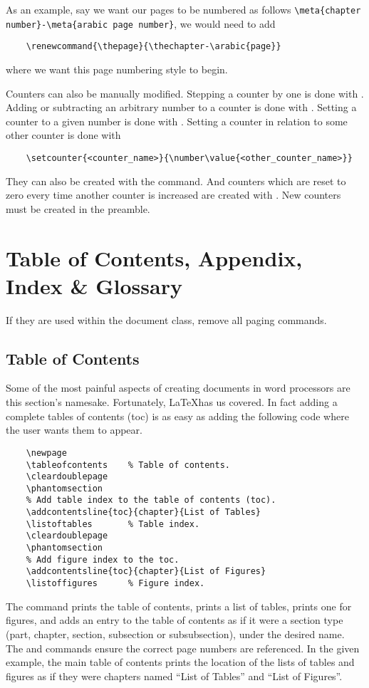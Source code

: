 As an example, say we want our pages to be numbered as follows
\verb|\meta{chapter number}-\meta{arabic page number}|, we would need to add
\begin{verbatim}
	\renewcommand{\thepage}{\thechapter-\arabic{page}}
\end{verbatim}
where we want this page numbering style to begin.

Counters can also be manually modified.  Stepping a counter by one is
done with .  Adding or subtracting
an arbitrary number to a counter is done with
.  Setting a counter to
a given number is done with
.  Setting a counter in
relation to some other counter is done with
\begin{verbatim}
	\setcounter{<counter_name>}{\number\value{<other_counter_name>}}
\end{verbatim}
They can also be created with the 
command.  And counters which are reset to zero every time another
counter is increased are created with
.  New counters
must be created in the preamble.
%
\section{Table of Contents, Appendix, Index \& Glossary}\label{s:contents}
%
If they are used within the  document class, remove all
paging commands.
\subsection{Table of Contents}
%
Some of the most painful aspects of creating documents in word
processors are this section's namesake.  Fortunately, \LaTeX has us
covered.  In fact adding a complete tables of contents (toc) is as
easy as adding the following code where the user wants them to appear.
\begin{verbatim}
	\newpage
	\tableofcontents    % Table of contents.
	\cleardoublepage
	\phantomsection
	% Add table index to the table of contents (toc).
	\addcontentsline{toc}{chapter}{List of Tables}
	\listoftables       % Table index.
	\cleardoublepage
	\phantomsection
	% Add figure index to the toc.
	\addcontentsline{toc}{chapter}{List of Figures}
	\listoffigures      % Figure index.
\end{verbatim}
The  command prints the table of contents,
 prints a list of tables, 
prints one for figures, and
 adds an entry to
the table of contents as if it were a section type (part, chapter,
section, subsection or subsubsection), under the desired name.  The
 and  commands ensure the
correct page numbers are referenced.  In the given example, the main
table of contents prints the location of the lists of tables and
figures as if they were chapters named ``List of Tables'' and ``List
of Figures''.

